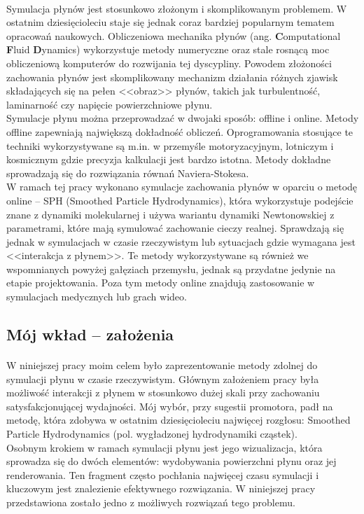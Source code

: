 \paragraph{}
Symulacja płynów jest stosunkowo złożonym i skomplikowanym problemem. W ostatnim dziesięcioleciu staje się jednak coraz bardziej popularnym tematem opracowań naukowych. Obliczeniowa mechanika płynów (ang. \textbf{C}omputational \textbf{F}luid \textbf{D}ynamics) wykorzystuje metody numeryczne oraz stale rosnącą moc obliczeniową komputerów do rozwijania tej dyscypliny. Powodem złożoności zachowania płynów jest skomplikowany mechanizm działania różnych zjawisk składających się na pełen <<obraz>> płynów, takich jak turbulentność, laminarność czy napięcie powierzchniowe płynu.\\
Symulacje płynu można przeprowadzać w dwojaki sposób: offline i online.
Metody offline zapewniają największą dokładność obliczeń. Oprogramowania stosujące te techniki wykorzystywane są m.in. w przemyśle motoryzacyjnym, lotniczym i kosmicznym gdzie precyzja kalkulacji jest bardzo istotna. Metody dokładne sprowadzają się do rozwiązania równań Naviera-Stokesa.\\
W ramach tej pracy wykonano symulacje zachowania płynów w oparciu o metodę online -- SPH (Smoothed Particle Hydrodynamics), która wykorzystuje podejście znane z dynamiki molekularnej i używa wariantu dynamiki Newtonowskiej z parametrami, które mają symulować zachowanie cieczy realnej. Sprawdzają się jednak w symulacjach w czasie rzeczywistym lub sytuacjach gdzie wymagana jest <<interakcja z płynem>>. Te metody wykorzystywane są również we wspomnianych powyżej gałęziach przemysłu, jednak są przydatne jedynie na etapie projektowania. Poza tym metody online znajdują zastosowanie w symulacjach medycznych lub grach wideo.
\par

\subsection{Mój wkład -- założenia}
\paragraph{}
W niniejszej pracy moim celem było zaprezentowanie metody zdolnej do symulacji płynu w czasie rzeczywistym. Głównym założeniem pracy była możliwość interakcji z płynem w stosunkowo dużej skali przy zachowaniu satysfakcjonującej wydajności. Mój wybór, przy sugestii promotora, padł na metodę, która zdobywa w ostatnim dziesięcioleciu najwięcej rozgłosu: Smoothed Particle Hydrodynamics (pol. wygładzonej hydrodynamiki cząstek).\\
Osobnym krokiem w ramach symulacji płynu jest jego wizualizacja, która sprowadza się do dwóch elementów: wydobywania powierzchni płynu oraz jej renderowania. Ten fragment często pochłania najwięcej czasu symulacji i kluczowym jest znalezienie efektywnego rozwiązania. W niniejszej pracy przedstawiona zostało jedno z możliwych rozwiązań tego problemu.
\par
